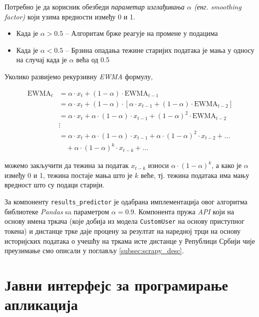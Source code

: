 \documentclass[12pt,oneside]{memoir}
\begin{document}
Потребно је да корисник обезбеди \textit{параметар изглађивања $\alpha$ (енг. smoothing factor)} који узима вредности између 0 и 1. 

\begin{itemize}
    \item Када је $ \alpha > 0.5 $ -- Алгоритам брже реагује на промене у подацима
    \item Када је $ \alpha < 0.5 $ -- Брзина опадања тежине старијих података је мања у односу на случај када је $\alpha$ већа од 0.5
\end{itemize}

Уколико развијемо рекурзивну \textit{EWMA} формулу,

\[
\begin{aligned}
\text{EWMA}_t &= \alpha \cdot x_t + (1 - \alpha) \cdot \text{EWMA}_{t-1} \\
              &= \alpha \cdot x_t + (1 - \alpha) \cdot \left[\alpha \cdot x_{t-1} + (1 - \alpha) \cdot \text{EWMA}_{t-2}\right] \\
              &= \alpha \cdot x_t + \alpha \cdot (1 - \alpha) \cdot x_{t-1} + (1 - \alpha)^2 \cdot \text{EWMA}_{t-2} \\
              &\vdots \\
              &= \alpha \cdot x_t + \alpha \cdot (1 - \alpha) \cdot x_{t-1} + \alpha \cdot (1 - \alpha)^2 \cdot x_{t-2} + \dots \\
              &\quad + \alpha \cdot (1 - \alpha)^k \cdot x_{t-k} + \dots
\end{aligned}
\]

\noindent можемо закључити да тежина за податак $x_{t-k}$ износи $\alpha \cdot (1 - \alpha)^k$, а како је $\alpha$ између 0 и 1, тежина постаје мања што је $k$ веће, тј. тежина података има мању вредност што су подаци старији.

За компоненту \texttt{results\_predictor} је одабрана имплементација овог алгоритма библиотеке \textit{Pandas} sa параметром $\alpha=0.9$. Компонента пружа \textit{API} који на основу имена тркача (које добија из модела \texttt{CustomUser} на основу приступног токена) и дистанце трке даје процену за резултат на наредној трци на основу историјских података о учешћу на тркама исте дистанце у Републици Србији чије преузимање смо описали у поглављу \ref{subsec:scrapy_desc}.


\section{Јавни интерфејс за програмирање апликација}
\end{document}
